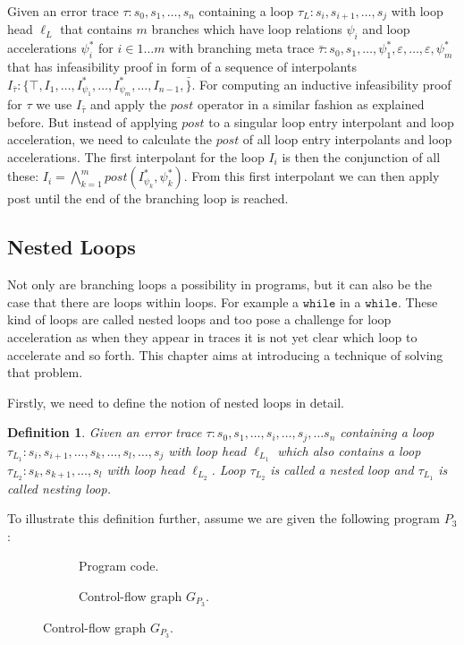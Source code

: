 \documentclass{article}
\newcommand{\loc}[1]{\ensuremath{\ell_{#1}}}
\newcounter{example}[section]
\newtheorem{mydef}{Definition}
\newcommand\mycom[1]{}
\newcommand\mycom[1]{#1}
\newcommand{\ts}[1]{\mycom{\todo[color=green!40,inline]{\small TS: #1}}}
\begin{document}
Given an error trace $\tau: s_0, s_1, \ldots, s_n$ containing a loop $\tau_L: s_i, s_{i+1}, \ldots, s_j$ with loop head $\loc{L}$ that contains $m$ branches which have loop relations $\psi_i$ and loop accelerations $\psi_{i}^*$ for $i \in 1 \ldots m$ with branching meta trace $\bar{\tau}: s_0, s_1, \ldots, \psi_{1}^*, \varepsilon, \ldots, \varepsilon, \psi_{m}^*$ that has infeasibility proof in form of a sequence of interpolants $I_{\bar{\tau}}: \{\top, I_1, \ldots, I_{\psi_{1}}^*, \ldots, I_{\psi_{m}}^*, \ldots, I_{n - 1}, \bar \}$. For computing an inductive infeasibility proof for $\tau$ we use $I_{\bar{\tau}}$ and apply the $post$ operator in a similar fashion as explained before. But instead of applying $post$ to a singular loop entry interpolant and loop acceleration, we need to calculate the $post$ of all loop entry interpolants and loop accelerations. The first interpolant for the loop $I_i$ is then the conjunction of all these: $I_i = \bigwedge_{k=1}^{m} post(I_{\psi_k}^*, \psi_k^*)$. From this first interpolant we can then apply post until the end of the branching loop is reached.
\ts{Explain why this works.}


\subsection{Nested Loops}
Not only are branching loops a possibility in programs, but it can also be the case that there are loops within loops. For example a $\texttt{while}$ in a $\texttt{while}$. These kind of loops are called nested loops and too pose a challenge for loop acceleration as when they appear in traces it is not yet clear which loop to accelerate and so forth. This chapter aims at introducing a technique of solving that problem. \\ \par

Firstly, we need to define the notion of nested loops in detail.
\begin{mydef}
	Given an error trace $\tau: s_0, s_1, \ldots, s_i, \ldots, s_j, \ldots s_n$ containing a loop \\ $\tau_{L_1}: s_i, s_{i+1}, \ldots, s_k, \ldots, s_l, \ldots, s_j$ with loop head $\loc{L_1}$ which also contains a loop $\tau_{L_2}: s_k, s_{k+1}, \ldots, s_l$ with loop head $\loc{L_2}$.
	Loop $\tau_{L_2}$ is called a nested loop and $\tau_{L_1}$ is called nesting loop.
\end{mydef}

To illustrate this definition further, assume we are given the following program $P_3$: \\
\begin{figure}[H]
	\centering
	\begin{subfigure}{0.3\textwidth}
		\centering
		
		\caption{Program code.}
	\end{subfigure}
	\hfill
	\begin{subfigure}{0.6\textwidth}
		\centering
		
		\caption{Control-flow graph $G_{P_3}$.}
	\end{subfigure}
	\label{fig:ex:p3}
\end{figure}
\end{document}
